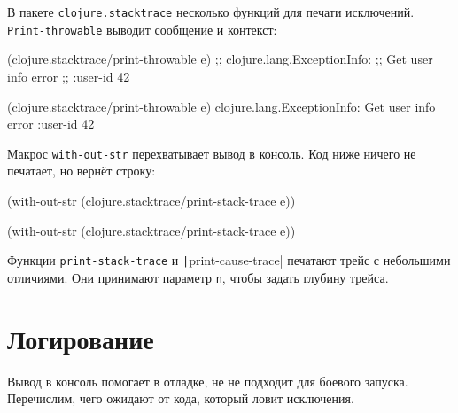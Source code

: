 
\mnoindent
В пакете \verb|clojure.stacktrace| несколько функций для печати
исключений. \verb|Print-throwable| выводит сообщение и контекст:

\ifx\devicetype\mobile

\begin{english}
  \begin{clojure}
(clojure.stacktrace/print-throwable e)
;; clojure.lang.ExceptionInfo:
;; Get user info error
;; {:user-id 42}
  \end{clojure}
\end{english}

\else

\begin{english}
  \begin{clojure}
(clojure.stacktrace/print-throwable e)
clojure.lang.ExceptionInfo: Get user info error
{:user-id 42}
  \end{clojure}
\end{english}

\fi

Макрос \verb|with-out-str| перехватывает вывод в консоль. Код ниже ничего не
печатает, но вернёт строку:

\ifx\devicetype\mobile

\begin{english}
  \begin{clojure}
(with-out-str
  (clojure.stacktrace/print-stack-trace
    e))
  \end{clojure}
\end{english}

\else

\begin{english}
  \begin{clojure}
(with-out-str
  (clojure.stacktrace/print-stack-trace e))
  \end{clojure}
\end{english}

\fi

Функции \verb|print-stack-trace| и \texttt|print-cause\--trace| печатают трейс с
небольшими отличиями. Они принимают параметр \verb|n|, чтобы задать глубину
трейса.

\section{Логирование}


Вывод в консоль помогает в отладке, не не подходит для боевого
запуска. Перечислим, чего ожидают от кода, который ловит исключения.

